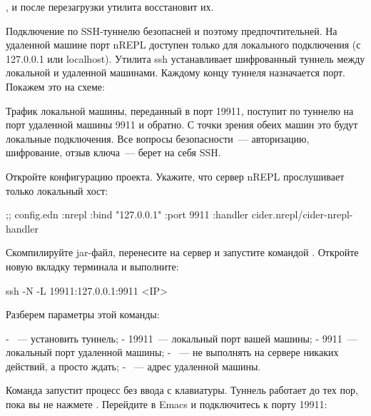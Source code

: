 , и после перезагрузки утилита восстановит их.

Подключение по SSH-туннелю безопасней и поэтому предпочтительней. На удаленной машине порт nREPL доступен только для локального подключения (с 127.0.0.1 или localhost). Утилита ssh устанавливает шифрованный туннель между локальной и удаленной машинами. Каждому концу туннеля назначается порт. Покажем это на схеме:


Трафик локальной машины, переданный в порт 19911, поступит по туннелю на порт удаленной машины 9911 и обратно. С точки зрения обеих машин это будут локальные подключения. Все вопросы безопасности~--- авторизацию, шифрование, отзыв ключа~--- берет на себя SSH.

Откройте конфигурацию проекта. Укажите, что сервер nREPL прослушивает только локальный хост:

\begin{english}
  \begin{clojure}
;; config.edn
{:nrepl {:bind "127.0.0.1"
         :port 9911
         :handler cider.nrepl/cider-nrepl-handler}}
  \end{clojure}
\end{english}

Скомпилируйте jar-файл, перенесите на сервер и запустите командой . Откройте новую вкладку терминала и выполните:

\begin{english}
  \begin{bash}
ssh -N -L 19911:127.0.0.1:9911 <IP>
  \end{bash}
\end{english}

Разберем параметры этой команды:

- ~--- установить туннель;
- 19911~--- локальный порт вашей машины;
- 9911~--- локальный порт удаленной машины;
- ~--- не выполнять на сервере никаких действий, а просто ждать;
- ~--- адрес удаленной машины.

Команда запустит процесс  без ввода с клавиатуры. Туннель работает до тех пор, пока вы не нажмете . Перейдите в Emacs и подключитесь к порту 19911:

